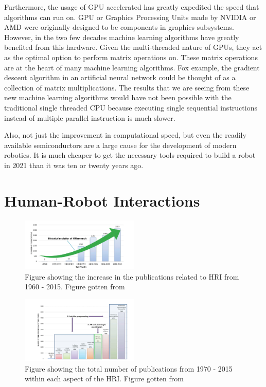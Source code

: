 \documentclass[conference]{IEEEtran}
\begin{document}
Furthermore, the usage of GPU accelerated has greatly expedited the speed that algorithms can run on. GPU or Graphics Processing Units made by NVIDIA or AMD were originally designed to be components in graphics subsystems. However, in the two few decades machine learning algorithms have greatly benefited from this hardware. Given the multi-threaded nature of GPUs, they act as the optimal option to perform matrix operations on\autocite{steinkraus2005using}. These matrix operations are at the heart of many machine learning algorithms. Fox example, the gradient descent algorithm in an artificial neural network could be thought of as a collection of matrix multiplications\autocite{krizhevsky2012imagenet}. The results that we are seeing from these new machine learning algorithms would have not been possible with the traditional single threaded CPU because executing single sequential instructions instead of multiple parallel instruction is much slower. 

Also, not just the improvement in computational speed, but even the readily available semiconductors are a large cause for the development of modern robotics. It is much cheaper to get the necessary tools required to build a robot in 2021 than it was ten or twenty years ago.

\section{Human-Robot Interactions}
\begin{figure}
    \centerline{\includegraphics[width=0.5\textwidth]{images/evolution_of_hri.png}}
    \caption{Figure showing the increase in the publications related to HRI from 1960 - 2015. Figure gotten from\autocite{tsarouchi2016human}}
\label{fig}
\end{figure}

\begin{figure}
    \centerline{\includegraphics[width=0.5\textwidth]{images/hri_total_number_of_publication.png}}
    \caption{Figure showing the total number of publications from 1970 - 2015 within each aspect of the HRI. Figure gotten from \autocite{tsarouchi2016human}}
\label{fig}
\end{figure}
\end{document}
